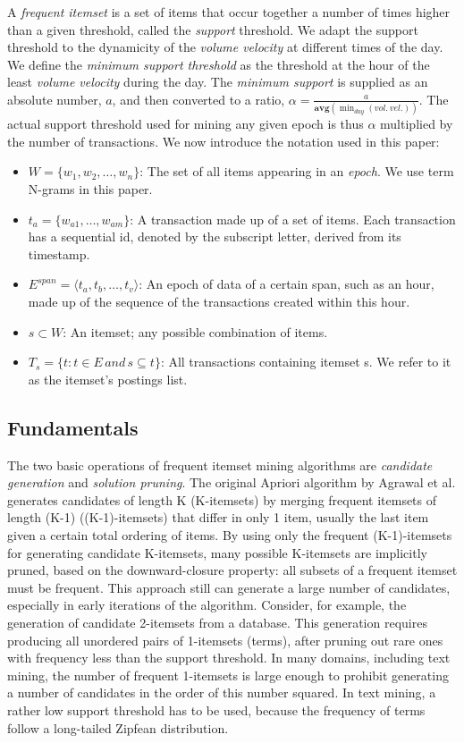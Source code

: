 \documentclass{sig-alternate}
\begin{document}
A \emph{frequent itemset} is a set of items that occur together a number of
times higher than a given threshold, called the \emph{support} threshold.
We adapt the support threshold to the dynamicity of the \emph{volume velocity} at
different times of the day.
We define the \emph{minimum support threshold} as the threshold at the hour
of the least \emph{volume velocity} during the day.
The \emph{minimum support} is supplied as an absolute number, $a$, and then
converted to a ratio, $\alpha = \frac{a}{\textbf{avg}(\min_{day}{(vol.\, vel.)})}$.
The actual support threshold used for mining any given epoch is thus
$\alpha$ multiplied by the number of transactions. 
We now introduce the notation used in this paper:
\begin{itemize}
\item $W = \{w_1,w_2,\ldots, w_n\}$: The set of all items appearing in an \emph{epoch}. 
We use term N-grams in this paper.
\item $t_a = \{w_{a1},\ldots, w_{am}\}$: A transaction made up of a set of items. Each transaction has a sequential id, denoted by the subscript letter, derived from its timestamp.
\item $E^{span} = \langle t_a, t_b, \ldots, t_v\rangle$: An epoch of data of a certain span, such as an hour, made up of the sequence of the transactions created within this hour.
\item $s \subset W$: An itemset; any possible combination of items. 
\item $T_s = \{t: t \in E \, and \, s \subseteq t\}$: All transactions containing itemset s. We refer to it as the itemset's postings list.
\end{itemize}

\subsection{Fundamentals}

The two basic operations of frequent itemset mining algorithms are
\emph{candidate generation} and \emph{solution pruning}.
The original Apriori algorithm by Agrawal et al. \cite{agrawal1994fast}
generates candidates of length K (K-itemsets) by merging frequent itemsets of
length (K-1) ((K-1)-itemsets) that differ in only 1 item, usually the last
item given a certain total ordering of items.
By using only the frequent  (K-1)-itemsets for generating candidate K-itemsets,
many possible K-itemsets are implicitly pruned, based on the downward-closure property:
all subsets of a frequent itemset must be frequent.
This approach still can generate a large number of candidates, especially
in early iterations of the algorithm.
Consider, for example, the generation of candidate 2-itemsets from a database.
This generation requires producing all unordered pairs of 1-itemsets (terms),
after pruning out rare ones with frequency less than the support threshold.
In many domains, including text mining, the number of frequent 1-itemsets is
large enough to prohibit generating a number of candidates in the order of this
number squared.
In text mining, a rather low support threshold has to be used, because the
frequency of terms follow a long-tailed Zipfean distribution.
\end{document}
